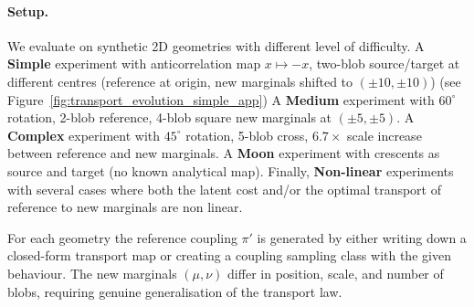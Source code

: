 \documentclass[11pt]{article}
\theoremstyle{definition}
\numberwithin{equation}{section}%
\begin{document}
\paragraph{Setup.}
We evaluate on synthetic 2D geometries with different level of difficulty.
A \textbf{Simple} experiment with anticorrelation map $x\mapsto -x$, two-blob source/target at different centres (reference at origin, new marginals shifted to $(\pm 10, \pm 10)$) (see Figure~\ref{fig:transport_evolution_simple_app})
A \textbf{Medium} experiment with $60^\circ$ rotation, 2-blob reference, 4-blob square new marginals at $(\pm 5, \pm 5)$.
A \textbf{Complex} experiment with $45^\circ$ rotation, 5-blob cross, $6.7\times$ scale increase between reference and new marginals.
A \textbf{Moon} experiment with crescents as source and target (no known analytical map).
Finally, \textbf{Non-linear} experiments with several cases where both the latent cost and/or the optimal transport of reference to new marginals are non linear.

For each geometry the reference coupling $\pi'$ is generated by either writing down a closed-form transport map or creating a coupling sampling class with the given behaviour.
The new marginals $(\mu,\nu)$ differ in position, scale, and number of
blobs, requiring genuine generalisation of the transport law.
\end{document}
